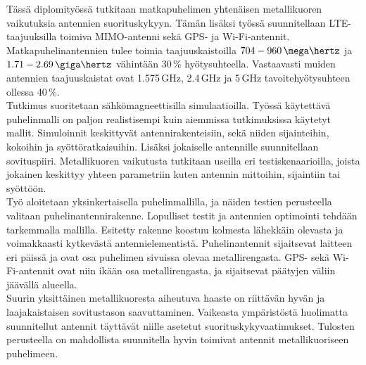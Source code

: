 
Tässä diplomityössä tutkitaan matkapuhelimen yhtenäisen metallikuoren vaikutuksia antennien suorituskykyyn. Tämän lisäksi työssä suunnitellaan LTE-taajuuksilla toimiva MIMO-antenni sekä GPS- ja Wi-Fi-antennit. Matkapuhelinantennien tulee toimia taajuuskaistoilla $704-960\,\mega\hertz$ ja $1.71-2.69\,\giga\hertz$ vähintään 30\,\% hyötysuhteella. Vastaavasti muiden antennien taajuuskaistat ovat 1.575\,GHz, 2.4\,GHz ja 5\,GHz tavoitehyötysuhteen ollessa 40\,\%. \\

Tutkimus suoritetaan sähkömagneettisilla simulaatioilla. Työssä käytettävä puhelinmalli on paljon realistisempi kuin aiemmissa tutkimuksissa käytetyt mallit. Simuloinnit keskittyvät antennirakenteisiin, sekä niiden sijainteihin, kokoihin ja syöttöratkaisuihin. Lisäksi jokaiselle antennille suunnitellaan sovituspiiri. Metallikuoren vaikutusta tutkitaan useilla eri testiskenaarioilla, joista jokainen keskittyy yhteen parametriin kuten antennin mittoihin, sijaintiin tai syöttöön. \\

Työ aloitetaan yksinkertaisella puhelinmallilla, ja näiden testien perusteella valitaan puhelinantennirakenne. Lopulliset testit ja antennien optimointi tehdään tarkemmalla mallilla. Esitetty rakenne koostuu kolmesta lähekkäin olevasta ja voimakkaasti kytkevästä antennielementistä. Puhelinantennit sijaitsevat laitteen eri päissä ja ovat osa puhelimen sivuissa olevaa metallirengasta. GPS- sekä Wi-Fi-antennit ovat niin ikään osa metallirengasta, ja sijaitsevat päätyjen väliin jäävällä alueella. \\

Suurin yksittäinen me\-tal\-li\-kuo\-res\-ta aiheutuva haaste on riittävän hyvän ja laajakaistaisen sovitustason saavuttaminen. Vaikeasta ympäristöstä huolimatta suunnitellut antennit täyttävät niille asetetut suorituskykyvaatimukset. Tulosten perusteella on mahdollista suunnitella hyvin toimivat antennit metallikuoriseen puhelimeen.
